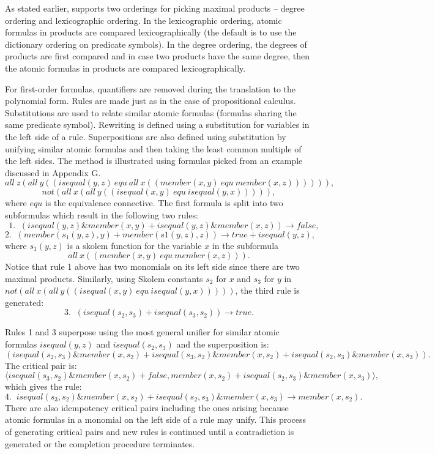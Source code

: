 As stated earlier, \RRL supports two orderings for picking
maximal products -- degree ordering and lexicographic ordering. In
the lexicographic ordering, atomic formulas in products are
compared lexicographically (the default is to use the dictionary
ordering on predicate symbols).  In the degree ordering, the
degrees of products are first compared and in case two products
have the same degree, then the atomic formulas in products are
compared lexicographically.

For first-order formulas, quantifiers are removed during the
translation to the polynomial form. Rules are made just as in the
case of propositional calculus. Substitutions are used to relate
similar atomic formulas (formulas sharing the same predicate
symbol).  Rewriting is defined using a substitution for variables
in the left side of a rule. Superpositions are also defined using
substitution by unifying similar atomic formulas and then taking
the least common multiple of the left sides.  The method is
illustrated using formulas picked from an example discussed in
Appendix G.
 \[ all~z (all~y ((isequal(y, z)~equ~all~x ((member(x, y)~equ~member(x, z)))))), \]
 \[ not(all~x (all~y ((isequal(x, y)~equ~isequal(y, x))))), \]
where $equ$ is the equivalence connective. The first formula is split
into two subformulas which result in the following two rules:
 \[ ~~ 1. \; \; (isequal(y, z) \& member(x, y) + isequal(y, z) \& member(x, z)) \rightarrow false, \]
 \[ 2. \; \; (member(s_1(y, z), y) + member(s1(y, z), z)) \rightarrow true + isequal(y, z), \]
where $s_1(y, z)$ is a skolem function for the variable $x$
in the subformula 
\[ all~x ((member(x, y)~equ~member(x, z))).\]
Notice that rule 1 above has two monomials on its left side since
there are two maximal products.
Similarly, using Skolem constants $s_2$ for $x$ and 
$s_3$ for $y$ in $not (all~x (all~y ((isequal(x, y)~equ~isequal(y, x)))))$,
the third rule is generated:
 \[3. \; \; (isequal(s_2, s_3) + isequal(s_3, s_2)) \rightarrow true.\]

Rules 1 and 3 superpose using the most general unifier for
similar atomic formulas $isequal(y, z)$ and $isequal(s_2, s_3)$ and
the superposition is: 
 \[ (isequal(s_2, s_3) \& member(x, s_2) + isequal(s_3, s_2) \& member(x, s_2) + isequal(s_2, s_3) \& member(x, s_3)). \]
The critical pair is: 
\[\langle isequal(s_3, s_2) \& member(x, s_2) + false, member(x, s_2) + isequal(s_2, s_3) \& member(x, s_3)\rangle ,\] 
which gives the rule:
 \[ 4. \; \; isequal(s_3, s_2) \& member(x, s_2) + isequal(s_2, s_3) \& member(x, s_3) \rightarrow member(x, s_2).\]
There are also idempotency critical pairs including the ones
arising because atomic formulas in a monomial on the left side of
a rule may unify.  This process of generating critical pairs and
new rules is continued until a contradiction is generated or 
the completion procedure terminates. 


